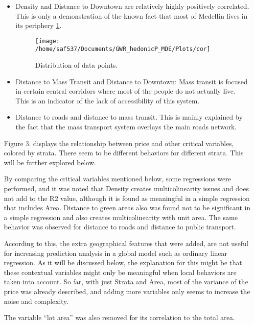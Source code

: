 \documentclass[journal]{IEEEtran}
\begin{document}
\begin{itemize}
\item Density and Distance to Downtown are relatively highly positively correlated. This is only a demonstration of the known fact that most of Medellín lives in its periphery \ref{cor}.

\begin{figure}[!t]
\centering
\texttt{[image: /home/saf537/Documents/GWR\_hedonicP\_MDE/Plots/cor]}
\caption{Distribution of data points.}
\label{cor}
\end{figure}

\item Distance to Mass Transit and Distance to Downtown: Mass transit is focused in certain central corridors where most of the people do not actually live. This is an indicator of the lack of accessibility of this system.

\item Distance to roads and distance to mass transit. This is mainly explained by the fact that the mass transport system overlays the main roads network.

\end{itemize}

Figure 3. displays the relationship between price and other critical variables, colored by strata. There seem to be different behaviors for different strata. This will be further explored below.

By comparing the critical variables mentioned below, some regressions were performed, and it was noted that Density creates multicolinearity issues and does not add to the R2 value, although it is found as
meaningful in a simple regression that includes Area. Distance to green areas also was found not to be significant in a simple regression and also creates multicolinearity with unit area. The same behavior was observed for distance to roads and distance to
public transport.

According to this, the extra geographical features that were added, are not useful for increasing prediction analysis in a global model such as ordinary linear regression. As it will be discussed below, the
explanation for this might be that these contextual variables might only be meaningful when local behaviors are taken into account. So far, with just Strata and Area, most of the variance of the price was
already described, and adding more variables only seems to increase the noise and complexity.

The variable “lot area” was also removed for its correlation to the total area.
\end{document}
